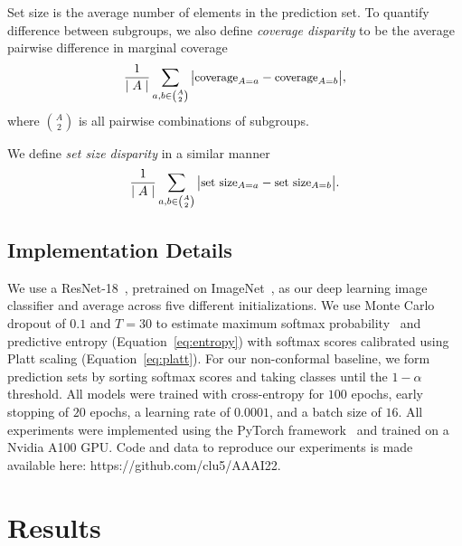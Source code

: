 \documentclass[letterpaper]{article} %
\begin{document}
        Set size is the average number of elements in the prediction set.
        To quantify difference between subgroups, we also define \textit{coverage disparity} to be the average pairwise difference in marginal coverage
        \begin{equation} \label{eq:cov-disparity}
        \small
        \frac{1}{\mid A \mid} \sum_{a, b \in \binom{A}{2}} \big\lvert \text{coverage}_{A=a} - \text{coverage}_{A=b} \big\rvert,
        \end{equation}
        where $\binom{A}{2}$ is all pairwise combinations of subgroups.

        We define \textit{set size disparity} in a similar manner
        \begin{equation} \label{eq:card-disparity}
        \small
        \frac{1}{\mid A \mid} \sum_{a, b \in \binom{A}{2}} \big\lvert \text{set size}_{A=a} - \text{set size}_{A=b} \big\rvert.
        \end{equation}

    \subsection{Implementation Details}
        We use a ResNet-18~\cite{DBLP:journals/corr/XieGDTH16}, pretrained on ImageNet~\cite{imagenet_cvpr09}, as our deep learning image classifier and average across five different initializations.
        We use Monte Carlo dropout of $0.1$ and $T=30$ to estimate maximum softmax probability~\cite{hendrycks17baseline} and predictive entropy (Equation~\ref{eq:entropy}) with softmax scores calibrated using Platt scaling (Equation~\ref{eq:platt}).
        For our non-conformal baseline, we form prediction sets by sorting softmax scores and taking classes until the $1 - \alpha$ threshold.
        All models were trained with cross-entropy for $100$ epochs, early stopping of $20$ epochs, a learning rate of $0.0001$, and a batch size of $16$.
        All experiments were implemented using the PyTorch framework~\cite{NEURIPS2019_9015} and trained on a Nvidia A100 GPU.
        Code and data to reproduce our experiments is made available here: https://github.com/clu5/AAAI22.


\section{Results}
\end{document}
